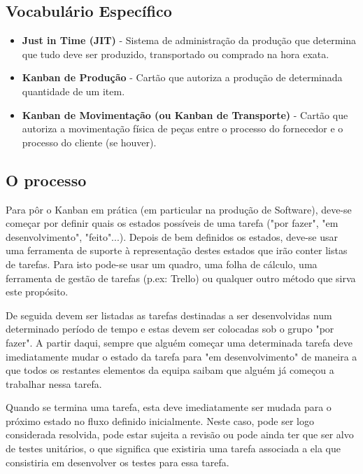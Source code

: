 \subsection{Vocabulário Específico}

\begin{itemize}
    \item \textbf{Just in Time (JIT)} - Sistema de administração da produção que determina que tudo deve ser produzido, transportado ou comprado na hora exata.
    
    \item \textbf{Kanban de Produção} - Cartão que autoriza a produção de determinada quantidade de um item.
    
    \item \textbf{Kanban de Movimentação (ou Kanban de Transporte)} - Cartão que autoriza a movimentação física de peças entre o processo do fornecedor e o processo do cliente (se houver).
    
\end{itemize}

\subsection{O processo}

Para pôr o Kanban em prática (em particular na produção de Software), deve-se começar por definir quais os estados possíveis de uma tarefa ("por fazer", "em desenvolvimento", "feito"...). Depois de bem definidos os estados, deve-se usar uma ferramenta de suporte à representação destes estados que irão conter listas de tarefas. Para isto pode-se usar um quadro, uma folha de cálculo, uma ferramenta de gestão de tarefas (p.ex: Trello) ou qualquer outro método que sirva este propósito.

De seguida devem ser listadas as tarefas destinadas a ser desenvolvidas num determinado período de tempo e estas devem ser colocadas sob o grupo "por fazer". A partir daqui, sempre que alguém começar uma determinada tarefa deve imediatamente mudar o estado da tarefa para "em desenvolvimento" de maneira a que todos os restantes elementos da equipa saibam que alguém já começou a trabalhar nessa tarefa.

Quando se termina uma tarefa, esta deve imediatamente ser mudada para o próximo estado no fluxo definido inicialmente. Neste caso, pode ser logo considerada resolvida, pode estar sujeita a revisão ou pode ainda ter que ser alvo de testes unitários, o que significa que existiria uma tarefa associada a ela que consistiria em desenvolver os testes para essa tarefa.

